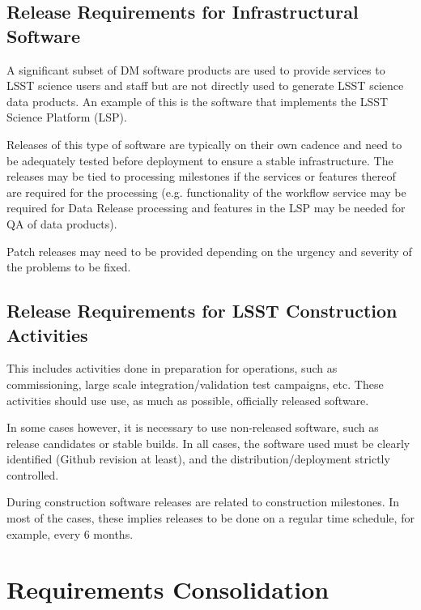 \subsection{Release Requirements for Infrastructural Software} \label{sec:infreqs}

A significant subset of \gls{DM} software products are used to provide services to \gls{LSST} science users and staff but are not directly used to generate \gls{LSST} science data products. An example of this is the software that implements the \gls{LSST} \gls{Science Platform} (\gls{LSP}).

Releases of this type of software are typically on their own cadence and need to be adequately tested before deployment to ensure a stable infrastructure.
The releases may be tied to processing milestones if the services or features thereof are required for the processing (e.g. functionality of the workflow service may be required for \gls{Data Release} processing and features in the \gls{LSP} may be needed for \gls{QA} of data products).

Patch releases may need to be provided depending on the urgency and severity of the problems to be fixed.


\subsection{Release Requirements for LSST Construction Activities} \label{sec:nonopsreqs}

This includes activities done in preparation for operations, such as commissioning,
large scale integration/validation test campaigns, etc. These activities should use use,  as much as possible,  officially released software.

In some cases however, it is necessary to use non-released software, such as release candidates or stable builds.
In all cases, the software used must be clearly identified (Github revision at least), and the distribution/deployment strictly controlled.

During construction software releases are related to construction milestones.
In most of the cases, these implies releases to be done on a regular time schedule, for example, every 6 months.


\newpage
\section{Requirements Consolidation} \label{sec:reqdef}

